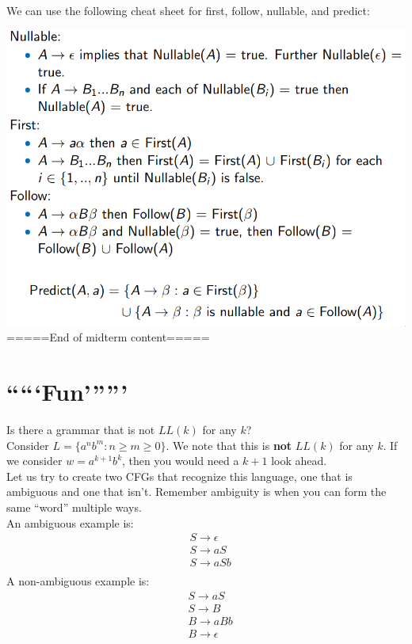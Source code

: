 \documentclass[12pt]{article}
\begin{document}
We can use the following cheat sheet for first, follow, nullable, and predict:\\
\begin{center}
    \includegraphics[scale=0.4]{cheat_sheet.png}\\
=====End of midterm content=====
\end{center}

\section{`````Fun''''''}
Is there a grammar that is not $LL(k)$ for any $k$? \\

Consider $L = \{a^nb^m : n \geq m \geq 0\}$.  We note that this is \textbf{not} $LL(k)$ for any $k$.  If we consider $w = a^{k+1}b^k$, then you would need a $k + 1$ look ahead. \\

Let us try to create two CFGs that recognize this language, one that is ambiguous and one that isn't.  Remember ambiguity is when you can form the same ``word'' multiple ways.\\

An ambiguous example is:
\begin{align}
    &S \rightarrow \epsilon \\
    &S \rightarrow aS\\
    &S \rightarrow aSb\\
\end{align}
A non-ambiguous example is:
\begin{align}
    &S \rightarrow aS \\
    &S \rightarrow B \\
    &B \rightarrow aBb \\
    &B \rightarrow \epsilon
\end{align}
\end{document}
